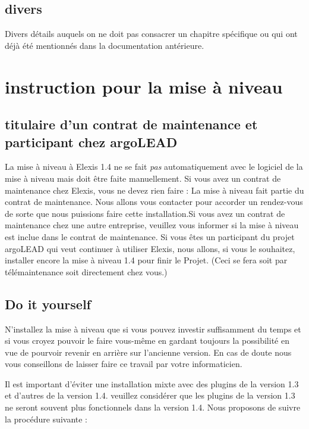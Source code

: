 \documentclass[a4paper]{scrartcl}
\begin{document}
\subsection{divers}
Divers détails auquels on ne doit pas consacrer un chapitre spécifique ou qui ont déjà été mentionnés dans la documentation antérieure.

\section{instruction pour la mise à niveau}
\label{update}
\subsection{titulaire d'un contrat de maintenance et participant chez argoLEAD}
La mise à niveau à Elexis 1.4 ne se fait \textit{pas} automatiquement avec le logiciel de la mise à niveau mais doit être faite manuellement. Si vous avez un contrat de maintenance chez Elexis, vous ne devez rien faire : La mise à niveau fait partie du contrat de maintenance. Nous allons vous contacter pour accorder un rendez-vous de sorte que nous puissions faire cette installation.Si vous avez un contrat de maintenance chez une autre entreprise, veuillez vous informer si la mise à niveau est inclue dans le contrat de maintenance. Si vous êtes un participant du projet argoLEAD qui veut continuer à utiliser Elexis, nous allons, si vous le souhaitez, installer encore la mise à niveau 1.4 pour finir le Projet. (Ceci se fera soit par télémaintenance soit directement chez vous.) 

\subsection{Do it yourself}
N'installez la mise à niveau que si vous pouvez investir suffisamment du temps et si vous croyez pouvoir le faire vous-même en gardant toujours la possibilité en vue de pourvoir revenir en arrière sur l'ancienne version. En cas de doute nous vous conseillons de laisser faire ce travail par votre informaticien.

\medskip

Il est important d'éviter une installation mixte avec des plugins de la version 1.3 et d'autres de la version 1.4. veuillez considérer que les plugins de la version 1.3 ne seront souvent plus fonctionnels dans la version 1.4. Nous proposons de suivre la procédure suivante :
\end{document}
